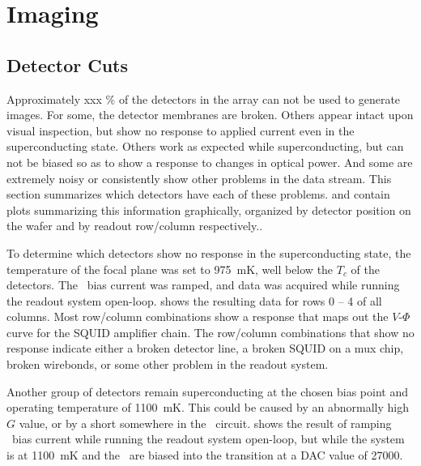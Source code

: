 \chapter{Imaging}\label{c:imaging}

\section{Detector Cuts}

Approximately xxx \% of the detectors in the array can not be used to generate images.
For some, the detector membranes are broken.
Others appear intact upon visual inspection, but show no response to applied current even in the superconducting state.
Others work as expected while superconducting, but can not be biased so as to show a response to changes in optical power. 
And some are extremely noisy or consistently show other problems in the data stream.
This section summarizes which detectors have each of these problems.
 and  contain plots summarizing this information graphically, organized by detector position on the wafer and by readout row/column respectively..

To determine which detectors show no response in the superconducting state, the temperature of the focal plane was set to 975~mK, well below the $T_c$ of the detectors.
The \TES\ bias current was ramped, and data was acquired while running the readout system open-loop.
 shows the resulting data for rows 0 -- 4 of all columns.
Most row/column combinations show a response that maps out the $V$-$\Phi$ curve for the SQUID amplifier chain.
The row/column combinations that show no response indicate either a broken detector line, a broken SQUID on a mux chip, broken wirebonds, or some other problem in the readout system.

Another group of detectors remain superconducting at the chosen bias point and operating temperature of 1100~mK.
This could be caused by an abnormally high $G$ value, or by a short somewhere in the \TES\ circuit.
 shows the result of ramping \TES\ bias current while running the readout system open-loop, but while the system is at 1100~mK and the \TESs\ are biased into the transition at a DAC value of 27000.

